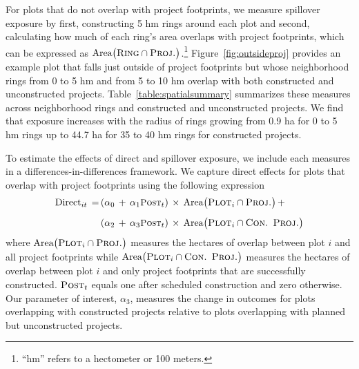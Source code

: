 \documentclass[12pt]{article}
\newcommand{\hmref}{
	``hm'' refers to a hectometer or 100 meters.
}
\begin{document}
For plots that do not overlap with project footprints, we measure spillover exposure by first, constructing 5 hm rings around each plot and second, calculating how much of each ring's area overlaps with project footprints, which can be expressed as $\text{Area}\big(\textsc{Ring}  \cap  \textsc{Proj.}\big)$.\footnote{\hmref}  Figure~\ref{fig:outsideproj} provides an example plot that falls just outside of project footprints but whose neighborhood rings from 0 to 5 hm and from 5 to 10 hm overlap with both constructed and unconstructed projects.  Table~\ref{table:spatialsummary} summarizes these measures across neighborhood rings and constructed and unconstructed projects.  We find that exposure increases with the radius of rings growing from 0.9 ha for 0 to 5 hm rings up to 44.7 ha for 35 to 40 hm rings for constructed projects.  

To estimate the effects of direct and spillover exposure, we include each measures in a differences-in-differences framework.  We capture direct effects for plots that overlap with project footprints using the following expression
\begin{align}
\begin{split}
\text{Direct}_{it} \,=\, &( \alpha_0 \, +  \, \alpha_1 \textsc{\small Post}_{t}) \, \times \, \text{Area}\big(\textsc{Plot}_i  \cap  \textsc{Proj.}\big) \, + \\[.5em]
&( \alpha_2 \, +  \, \alpha_3 \textsc{\small Post}_{t})  \, \times \, \text{Area}\big(\textsc{Plot}_i \cap \textsc{Con. Proj.}\big)
\end{split}
\end{align}
\noindent where $\text{Area}\big(\textsc{Plot}_i  \cap  \textsc{Proj.}\big)$ measures the hectares of overlap between plot $i$ and all project footprints while $\text{Area}\big(\textsc{Plot}_i \cap \textsc{Con. Proj.}\big)$ measures the hectares of overlap between plot $i$ and only project footprints that are successfully constructed.  $\textsc{Post}_{t}$ equals one after scheduled construction and zero otherwise.  Our parameter of interest, $\alpha_3$, measures the change in outcomes for plots overlapping with constructed projects relative to plots overlapping with planned but unconstructed projects.  
\end{document}
